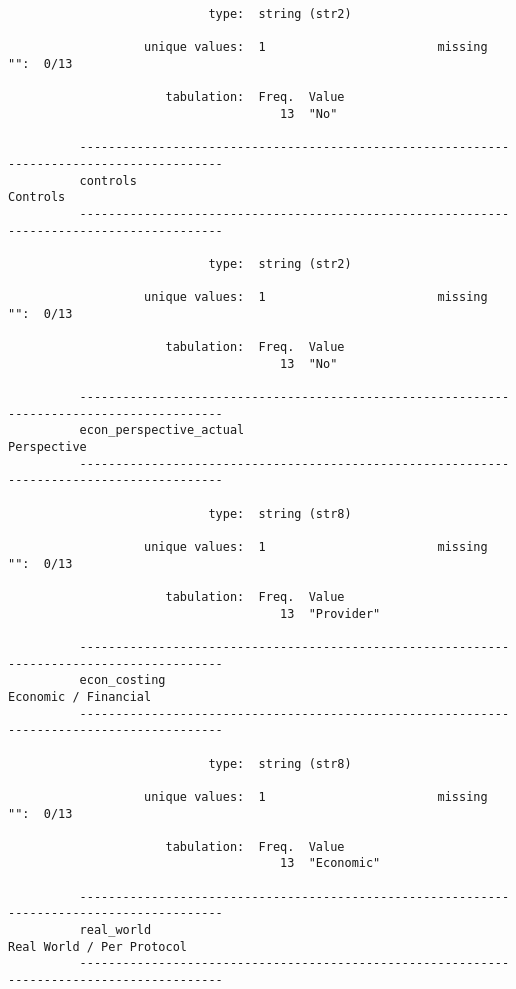 \documentclass{article}
\begin{document}
\begin{verbatim}
                            type:  string (str2)
          
                   unique values:  1                        missing "":  0/13
          
                      tabulation:  Freq.  Value
                                      13  "No"
          
          ------------------------------------------------------------------------------------------
          controls                                                                          Controls
          ------------------------------------------------------------------------------------------
          
                            type:  string (str2)
          
                   unique values:  1                        missing "":  0/13
          
                      tabulation:  Freq.  Value
                                      13  "No"
          
          ------------------------------------------------------------------------------------------
          econ_perspective_actual                                                        Perspective
          ------------------------------------------------------------------------------------------
          
                            type:  string (str8)
          
                   unique values:  1                        missing "":  0/13
          
                      tabulation:  Freq.  Value
                                      13  "Provider"
          
          ------------------------------------------------------------------------------------------
          econ_costing                                                          Economic / Financial
          ------------------------------------------------------------------------------------------
          
                            type:  string (str8)
          
                   unique values:  1                        missing "":  0/13
          
                      tabulation:  Freq.  Value
                                      13  "Economic"
          
          ------------------------------------------------------------------------------------------
          real_world                                                       Real World / Per Protocol
          ------------------------------------------------------------------------------------------
          

\end{verbatim}
\end{document}
